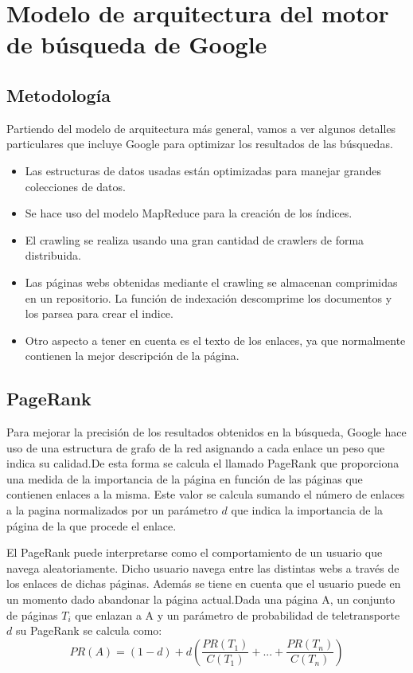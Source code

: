\documentclass[a4paper, 11pt]{article} %
\begin{document}
	\section{Modelo de arquitectura del motor de búsqueda de Google}
		\subsection{Metodología}
		Partiendo del modelo de arquitectura más general, vamos a ver algunos detalles particulares que incluye Google para optimizar los resultados de las búsquedas.
		\begin{itemize}
			\item Las estructuras de datos usadas están optimizadas para manejar grandes colecciones de datos.
			\item Se hace uso del modelo MapReduce para la creación de los índices.
			\item El crawling se realiza usando una gran cantidad de crawlers de forma distribuida.
			\item Las páginas webs obtenidas mediante el crawling se almacenan comprimidas en un repositorio. La función de indexación descomprime los documentos y los parsea para crear el indice.
			\item Otro aspecto a tener en cuenta es el texto de los enlaces, ya que normalmente contienen la mejor descripción de la página.
		\end{itemize}


		\subsection{PageRank}
		Para mejorar la precisión de los resultados obtenidos en la búsqueda, Google hace uso de una estructura de grafo de la red asignando a cada enlace un peso que indica su calidad.De esta forma se calcula el llamado PageRank que proporciona una medida de la importancia de la página en función de las páginas que contienen enlaces a la misma. Este valor se calcula sumando el número de enlaces a la pagina normalizados por un parámetro $d$ que indica la importancia de la página de la que procede el enlace.

		El PageRank puede interpretarse como el comportamiento de un usuario que navega aleatoriamente. Dicho usuario navega entre las distintas webs a través de los enlaces de dichas páginas. Además se tiene en cuenta que el usuario puede en un momento dado abandonar la página actual.Dada una página A, un conjunto de páginas $T_i$ que enlazan a A y un parámetro de probabilidad de teletransporte $d$ su PageRank se calcula como:\\
		\[
		 PR(A)=(1-d)+d(\frac{PR(T_1)}{C(T_1)}+...+\frac{PR(T_n)}{C(T_n)})
		\]
\end{document}

